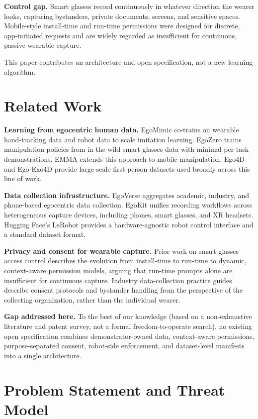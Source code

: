 \documentclass[10pt,twocolumn,letterpaper]{article}
\begin{document}
\textbf{Control gap.} Smart glasses record continuously in whatever direction the wearer looks, capturing bystanders, private documents, screens, and sensitive spaces. Mobile-style install-time and run-time permissions were designed for discrete, app-initiated requests and are widely regarded as insufficient for continuous, passive wearable capture.

This paper contributes an architecture and open specification, not a new learning algorithm.

\section{Related Work}

\textbf{Learning from egocentric human data.} EgoMimic co-trains on wearable hand-tracking data and robot data to scale imitation learning. EgoZero trains manipulation policies from in-the-wild smart-glasses data with minimal per-task demonstrations. EMMA extends this approach to mobile manipulation. Ego4D and Ego-Exo4D provide large-scale first-person datasets used broadly across this line of work.

\textbf{Data collection infrastructure.} EgoVerse aggregates academic, industry, and phone-based egocentric data collection. EgoKit unifies recording workflows across heterogeneous capture devices, including phones, smart glasses, and XR headsets. Hugging Face's LeRobot provides a hardware-agnostic robot control interface and a standard dataset format.

\textbf{Privacy and consent for wearable capture.} Prior work on smart-glasses access control describes the evolution from install-time to run-time to dynamic, context-aware permission models, arguing that run-time prompts alone are insufficient for continuous capture. Industry data-collection practice guides describe consent protocols and bystander handling from the perspective of the collecting organization, rather than the individual wearer.

\textbf{Gap addressed here.} To the best of our knowledge (based on a non-exhaustive literature and patent survey, not a formal freedom-to-operate search), no existing open specification combines demonstrator-owned data, context-aware permissions, purpose-separated consent, robot-side enforcement, and dataset-level manifests into a single architecture.

\section{Problem Statement and Threat Model}
\end{document}
